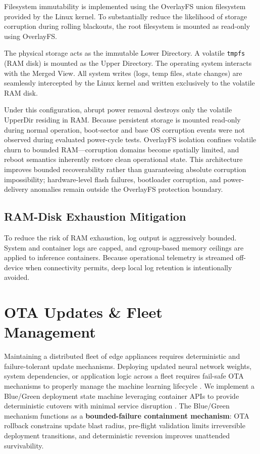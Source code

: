 \documentclass[conference]{IEEEtran}
\begin{document}
Filesystem immutability is implemented using the OverlayFS union filesystem provided by the Linux kernel. To substantially reduce the likelihood of storage corruption during rolling blackouts, the root filesystem is mounted as read-only using OverlayFS. 

The physical storage acts as the immutable Lower Directory. A volatile \texttt{tmpfs} (RAM disk) is mounted as the Upper Directory. The operating system interacts with the Merged View. All system writes (logs, temp files, state changes) are seamlessly intercepted by the Linux kernel and written exclusively to the volatile RAM disk. 

Under this configuration, abrupt power removal destroys only the volatile UpperDir residing in RAM. Because persistent storage is mounted read-only during normal operation, boot-sector and base OS corruption events were not observed during evaluated power-cycle tests. OverlayFS isolation confines volatile churn to bounded RAM---corruption domains become spatially limited, and reboot semantics inherently restore clean operational state. This architecture improves bounded recoverability rather than guaranteeing absolute corruption impossibility; hardware-level flash failures, bootloader corruption, and power-delivery anomalies remain outside the OverlayFS protection boundary.

\subsection{RAM-Disk Exhaustion Mitigation}
To reduce the risk of RAM exhaustion, log output is aggressively bounded. System and container logs are capped, and cgroup-based memory ceilings are applied to inference containers. Because operational telemetry is streamed off-device when connectivity permits, deep local log retention is intentionally avoided.

\section{OTA Updates \& Fleet Management}

Maintaining a distributed fleet of edge appliances requires deterministic and failure-tolerant update mechanisms. Deploying updated neural network weights, system dependencies, or application logic across a fleet requires fail-safe OTA mechanisms \cite{b18} to properly manage the machine learning lifecycle \cite{b7}. We implement a Blue/Green deployment state machine leveraging container APIs to provide deterministic cutovers with minimal service disruption \cite{b9}. The Blue/Green mechanism functions as a \textbf{bounded-failure containment mechanism}: OTA rollback constrains update blast radius, pre-flight validation limits irreversible deployment transitions, and deterministic reversion improves unattended survivability.
\end{document}
